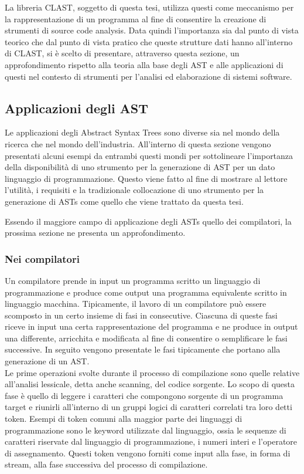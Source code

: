 La libreria CLAST, soggetto di questa tesi, utilizza questi come meccanismo per
la rappresentazione di un programma al fine di consentire la creazione di
strumenti di source code analysis. Data quindi l'importanza sia dal punto di
vista teorico che dal punto di vista pratico che queste strutture dati hanno
all'interno di CLAST, si è scelto di presentare, attraverso questa sezione, un
approfondimento rispetto alla teoria alla base degli AST e alle applicazioni di
questi nel contesto di strumenti per l'analisi ed elaborazione di sistemi
software.

\subsection{Applicazioni degli AST}

Le applicazioni degli Abstract Syntax Trees sono diverse sia nel mondo della
ricerca che nel mondo dell’industria. All’interno di questa sezione vengono
presentati alcuni esempi da entrambi questi mondi per sottolineare l’importanza
della disponibilità di uno strumento per la generazione di AST per un dato
linguaggio di programmazione. Questo viene fatto al fine di mostrare al lettore
l’utilità, i requisiti e la tradizionale collocazione di uno strumento per la
generazione di ASTs come quello che viene trattato da questa tesi.

Essendo il maggiore campo di applicazione degli ASTs quello dei compilatori, la
prossima sezione ne presenta un approfondimento.

\subsubsection{Nei compilatori}

Un compilatore prende in input un programma scritto un linguaggio di
programmazione e produce come output una programma equivalente scritto in
linguaggio macchina. Tipicamente, il lavoro di un compilatore può essere
scomposto in un certo insieme di fasi in consecutive. Ciascuna di queste fasi
riceve in input una certa rappresentazione del programma e ne produce in output
una differente, arricchita e modificata al fine di consentire o semplificare le
fasi successive. In seguito vengono presentate le fasi tipicamente che portano
alla generazione di un AST.\\

Le prime operazioni svolte durante il processo di compilazione sono quelle
relative all’analisi lessicale, detta anche scanning, del codice sorgente. Lo
scopo di questa fase è quello di leggere i caratteri che compongono sorgente di
un programma target e riunirli all’interno di un gruppi logici di caratteri
correlati tra loro detti token. Esempi di token comuni alla maggior parte dei
linguaggi di programmazione sono le keyword utilizzate dal linguaggio, ossia le
sequenze di caratteri riservate dal linguaggio di programmazione, i numeri
interi e l’operatore di assegnamento. Questi token vengono forniti come input
alla fase, in forma di stream, alla fase successiva del processo di
compilazione.\\

